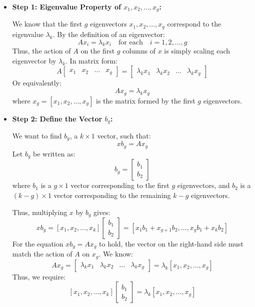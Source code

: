 \documentclass{article}
\begin{document}
\begin{itemize}
    \item \textbf{Step 1: Eigenvalue Property of \( x_1, x_2, \dots, x_g \):}

    We know that the first \( g \) eigenvectors \( x_1, x_2, \dots, x_g \) correspond to the eigenvalue \( \lambda_k \). By the definition of an eigenvector:
    \[
    A x_i = \lambda_k x_i \quad \text{for each} \quad i = 1, 2, \dots, g
    \]
    Thus, the action of \( A \) on the first \( g \) columns of \( x \) is simply scaling each eigenvector by \( \lambda_k \). In matrix form:
    \[
    A \begin{bmatrix} x_1 & x_2 & \dots & x_g \end{bmatrix} = \begin{bmatrix} \lambda_k x_1 & \lambda_k x_2 & \dots & \lambda_k x_g \end{bmatrix}
    \]
    Or equivalently:
    \[
    A x_g = \lambda_k x_g
    \]
    where \( x_g = [x_1, x_2, \dots, x_g] \) is the matrix formed by the first \( g \) eigenvectors.

    \item \textbf{Step 2: Define the Vector \( b_g \):}

    We want to find \( b_g \), a \( k \times 1 \) vector, such that:
    \[
    x b_g = A x_g
    \]
    Let \( b_g \) be written as:
    \[
    b_g = \begin{bmatrix} b_1 \\ b_2 \end{bmatrix}
    \]
    where \( b_1 \) is a \( g \times 1 \) vector corresponding to the first \( g \) eigenvectors, and \( b_2 \) is a \( (k - g) \times 1 \) vector corresponding to the remaining \( k - g \) eigenvectors.

    Thus, multiplying \( x \) by \( b_g \) gives:
    \[
    x b_g = [x_1, x_2, \dots, x_k] \begin{bmatrix} b_1 \\ b_2 \end{bmatrix} = [x_1 b_1 + x_{g+1} b_2, \dots, x_g b_1 + x_k b_2]
    \]
    For the equation \( x b_g = A x_g \) to hold, the vector on the right-hand side must match the action of \( A \) on \( x_g \). We know:
    \[
    A x_g = \begin{bmatrix} \lambda_k x_1 & \lambda_k x_2 & \dots & \lambda_k x_g \end{bmatrix} = \lambda_k [x_1, x_2, \dots, x_g]
    \]
    Thus, we require:
    \[
    [x_1, x_2, \dots, x_k] \begin{bmatrix} b_1 \\ b_2 \end{bmatrix} = \lambda_k [x_1, x_2, \dots, x_g]
    \]


\end{itemize}
\end{document}
